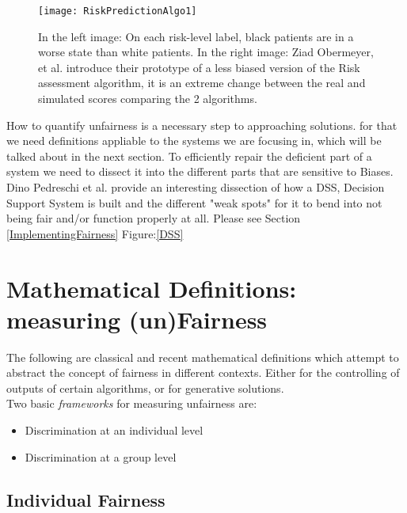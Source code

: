 \begin{itemize}
\end{itemize}

\begin{figure}[h]
  \begin{center}
    \texttt{[image: RiskPredictionAlgo1]}
    \cite{OPVM19}
    \caption{In the left image: On each risk-level label, black patients are in a worse state than white patients. In the right image: Ziad Obermeyer, et al. introduce their prototype of a less biased version of the Risk assessment algorithm, it is an extreme change between the real and simulated scores comparing the 2 algorithms.}
  \end{center}
\end{figure}

How to quantify unfairness is a necessary step to approaching solutions.\cite{SHG*18} for that we need definitions appliable to the systems we are focusing in, which will be talked about in the next section. To efficiently repair the deficient part of a system we need to dissect it into the different parts that are sensitive to Biases. Dino Pedreschi et al. provide an interesting dissection of how a DSS, Decision Support System is built and the different "weak spots" for it to bend into not being fair and/or function properly at all. Please see Section \ref{ImplementingFairness} Figure:\ref{DSS}

\section{Mathematical Definitions: measuring (un)Fairness}
\label{mathdefinitions}
The following are classical and recent mathematical definitions which attempt to abstract the concept of fairness in different contexts. Either for the controlling of outputs of certain algorithms, or for generative solutions.\\
Two basic \textsl{frameworks} for measuring unfairness are:
\begin{itemize}
  \item Discrimination at an individual level
  \item Discrimination at a group level
\end{itemize}


\subsection{Individual Fairness}

